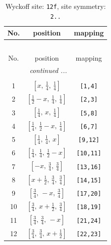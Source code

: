 \documentclass[fleqn,8pt]{jsarticle}
\begin{document}
\begin{longtable}{ccc}
\caption{Wyckoff site: {\tt 12f}, site symmetry: {\tt 2..}}
 \\
 \hline \hline
No. & position & mapping \\ \hline \endfirsthead

\multicolumn{2}{l}{\tablename\ \thetable{}} \\
 \hline \hline
No. & position & mapping \\ \hline \endhead

 \hline \hline
\multicolumn{2}{r}{\footnotesize\it continued ...} \\ \endfoot

 \hline \hline
\multicolumn{2}{r}{} \\ \endlastfoot

1 & $\left[ x,\, \frac{1}{4},\, \frac{1}{4} \right]$ & {\tt [1,4]} \\ \hline
2 & $\left[ \frac{1}{2} - x,\, \frac{1}{4},\, \frac{1}{4} \right]$ & {\tt [2,3]} \\ \hline
3 & $\left[ \frac{1}{4},\, x,\, \frac{1}{4} \right]$ & {\tt [5,8]} \\ \hline
4 & $\left[ \frac{1}{4},\, \frac{1}{2} - x,\, \frac{1}{4} \right]$ & {\tt [6,7]} \\ \hline
5 & $\left[ \frac{1}{4},\, \frac{1}{4},\, x \right]$ & {\tt [9,12]} \\ \hline
6 & $\left[ \frac{1}{4},\, \frac{1}{4},\, \frac{1}{2} - x \right]$ & {\tt [10,11]} \\ \hline
7 & $\left[ - x,\, \frac{3}{4},\, \frac{3}{4} \right]$ & {\tt [13,16]} \\ \hline
8 & $\left[ x + \frac{1}{2},\, \frac{3}{4},\, \frac{3}{4} \right]$ & {\tt [14,15]} \\ \hline
9 & $\left[ \frac{3}{4},\, - x,\, \frac{3}{4} \right]$ & {\tt [17,20]} \\ \hline
10 & $\left[ \frac{3}{4},\, x + \frac{1}{2},\, \frac{3}{4} \right]$ & {\tt [18,19]} \\ \hline
11 & $\left[ \frac{3}{4},\, \frac{3}{4},\, - x \right]$ & {\tt [21,24]} \\ \hline
12 & $\left[ \frac{3}{4},\, \frac{3}{4},\, x + \frac{1}{2} \right]$ & {\tt [22,23]} \\
\end{longtable}
\renewcommand{\arraystretch}{1.2}
\end{document}
